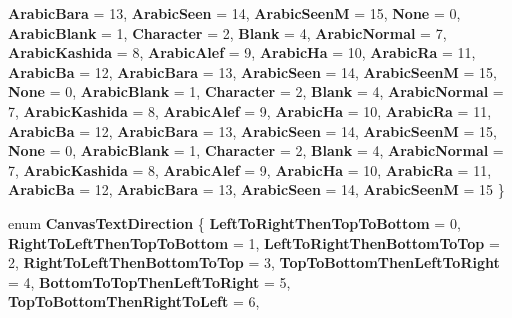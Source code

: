 \begin{DoxyCompactItemize}
{\bfseries Arabic\+Bara} = 13, 
\newline
{\bfseries Arabic\+Seen} = 14, 
{\bfseries Arabic\+SeenM} = 15, 
{\bfseries None} = 0, 
{\bfseries Arabic\+Blank} = 1, 
\newline
{\bfseries Character} = 2, 
{\bfseries Blank} = 4, 
{\bfseries Arabic\+Normal} = 7, 
{\bfseries Arabic\+Kashida} = 8, 
\newline
{\bfseries Arabic\+Alef} = 9, 
{\bfseries Arabic\+Ha} = 10, 
{\bfseries Arabic\+Ra} = 11, 
{\bfseries Arabic\+Ba} = 12, 
\newline
{\bfseries Arabic\+Bara} = 13, 
{\bfseries Arabic\+Seen} = 14, 
{\bfseries Arabic\+SeenM} = 15, 
{\bfseries None} = 0, 
\newline
{\bfseries Arabic\+Blank} = 1, 
{\bfseries Character} = 2, 
{\bfseries Blank} = 4, 
{\bfseries Arabic\+Normal} = 7, 
\newline
{\bfseries Arabic\+Kashida} = 8, 
{\bfseries Arabic\+Alef} = 9, 
{\bfseries Arabic\+Ha} = 10, 
{\bfseries Arabic\+Ra} = 11, 
\newline
{\bfseries Arabic\+Ba} = 12, 
{\bfseries Arabic\+Bara} = 13, 
{\bfseries Arabic\+Seen} = 14, 
{\bfseries Arabic\+SeenM} = 15, 
\newline
{\bfseries None} = 0, 
{\bfseries Arabic\+Blank} = 1, 
{\bfseries Character} = 2, 
{\bfseries Blank} = 4, 
\newline
{\bfseries Arabic\+Normal} = 7, 
{\bfseries Arabic\+Kashida} = 8, 
{\bfseries Arabic\+Alef} = 9, 
{\bfseries Arabic\+Ha} = 10, 
\newline
{\bfseries Arabic\+Ra} = 11, 
{\bfseries Arabic\+Ba} = 12, 
{\bfseries Arabic\+Bara} = 13, 
{\bfseries Arabic\+Seen} = 14, 
\newline
{\bfseries Arabic\+SeenM} = 15
 \}
\item 
\mbox{\label{namespace_microsoft_1_1_graphics_1_1_canvas_1_1_text_a1e2efbc072261f0f4a89ae31e85b3d2a}} 
enum {\bfseries Canvas\+Text\+Direction} \{ \newline
{\bfseries Left\+To\+Right\+Then\+Top\+To\+Bottom} = 0, 
{\bfseries Right\+To\+Left\+Then\+Top\+To\+Bottom} = 1, 
{\bfseries Left\+To\+Right\+Then\+Bottom\+To\+Top} = 2, 
{\bfseries Right\+To\+Left\+Then\+Bottom\+To\+Top} = 3, 
\newline
{\bfseries Top\+To\+Bottom\+Then\+Left\+To\+Right} = 4, 
{\bfseries Bottom\+To\+Top\+Then\+Left\+To\+Right} = 5, 
{\bfseries Top\+To\+Bottom\+Then\+Right\+To\+Left} = 6, 

\end{DoxyCompactItemize}

